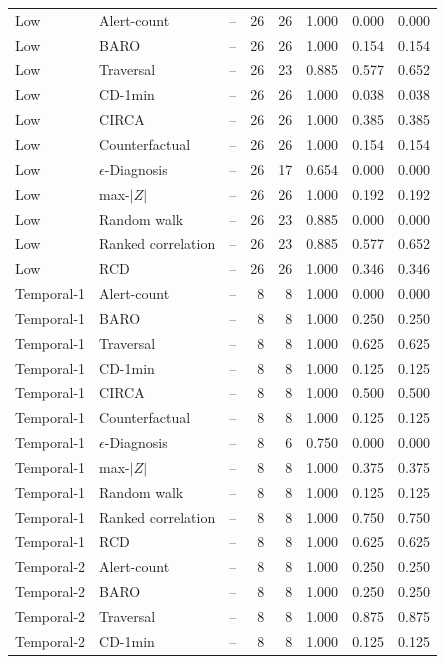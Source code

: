 {\begin{longtable}{llrrrrrr}
Low & Alert-count & -- & 26 & 26 & 1.000 & 0.000 & 0.000 \\
Low & BARO & -- & 26 & 26 & 1.000 & 0.154 & 0.154 \\
Low & Traversal & -- & 26 & 23 & 0.885 & 0.577 & 0.652 \\
Low & CD-1min & -- & 26 & 26 & 1.000 & 0.038 & 0.038 \\
Low & CIRCA & -- & 26 & 26 & 1.000 & 0.385 & 0.385 \\
Low & Counterfactual & -- & 26 & 26 & 1.000 & 0.154 & 0.154 \\
Low & $\epsilon$-Diagnosis & -- & 26 & 17 & 0.654 & 0.000 & 0.000 \\
Low & max-$|Z|$ & -- & 26 & 26 & 1.000 & 0.192 & 0.192 \\
Low & Random walk & -- & 26 & 23 & 0.885 & 0.000 & 0.000 \\
Low & Ranked correlation & -- & 26 & 23 & 0.885 & 0.577 & 0.652 \\
Low & RCD & -- & 26 & 26 & 1.000 & 0.346 & 0.346 \\
Temporal-1 & Alert-count & -- & 8 & 8 & 1.000 & 0.000 & 0.000 \\
Temporal-1 & BARO & -- & 8 & 8 & 1.000 & 0.250 & 0.250 \\
Temporal-1 & Traversal & -- & 8 & 8 & 1.000 & 0.625 & 0.625 \\
Temporal-1 & CD-1min & -- & 8 & 8 & 1.000 & 0.125 & 0.125 \\
Temporal-1 & CIRCA & -- & 8 & 8 & 1.000 & 0.500 & 0.500 \\
Temporal-1 & Counterfactual & -- & 8 & 8 & 1.000 & 0.125 & 0.125 \\
Temporal-1 & $\epsilon$-Diagnosis & -- & 8 & 6 & 0.750 & 0.000 & 0.000 \\
Temporal-1 & max-$|Z|$ & -- & 8 & 8 & 1.000 & 0.375 & 0.375 \\
Temporal-1 & Random walk & -- & 8 & 8 & 1.000 & 0.125 & 0.125 \\
Temporal-1 & Ranked correlation & -- & 8 & 8 & 1.000 & 0.750 & 0.750 \\
Temporal-1 & RCD & -- & 8 & 8 & 1.000 & 0.625 & 0.625 \\
Temporal-2 & Alert-count & -- & 8 & 8 & 1.000 & 0.250 & 0.250 \\
Temporal-2 & BARO & -- & 8 & 8 & 1.000 & 0.250 & 0.250 \\
Temporal-2 & Traversal & -- & 8 & 8 & 1.000 & 0.875 & 0.875 \\
Temporal-2 & CD-1min & -- & 8 & 8 & 1.000 & 0.125 & 0.125 \\

\end{longtable}}

